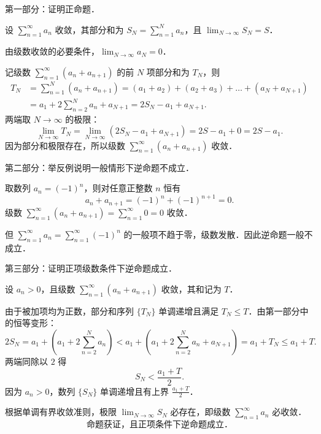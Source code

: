 \begin{solution}
    第一部分：证明正命题．

    设 $\sum_{n=1}^\infty a_n$ 收敛，其部分和为 $S_N = \sum_{n=1}^N a_n$，且 $\lim_{N\to\infty} S_N = S$．

    由级数收敛的必要条件，$\lim_{N\to\infty} a_N = 0$．

    记级数 $\sum_{n=1}^\infty (a_n + a_{n+1})$ 的前 $N$ 项部分和为 $T_N$，则
    \begin{equation}
        \begin{aligned}
            T_N & = \sum_{n=1}^N (a_n + a_{n+1}) = (a_1 + a_2) + (a_2 + a_3) + \dots + (a_N + a_{N+1}) \\
                & = a_1 + 2\sum_{n=2}^N a_n + a_{N+1} = 2S_N - a_1 + a_{N+1}.
        \end{aligned}
    \end{equation}
    两端取 $N \to \infty$ 的极限：
    \begin{equation}
        \lim_{N\to\infty} T_N = \lim_{N\to\infty} (2S_N - a_1 + a_{N+1}) = 2S - a_1 + 0 = 2S - a_1.
    \end{equation}
    因为部分和极限存在，所以级数 $\sum_{n=1}^\infty (a_n + a_{n+1})$ 收敛．

    第二部分：举反例说明一般情形下逆命题不成立．

    取数列 $a_n = (-1)^n$，则对任意正整数 $n$ 恒有
    \begin{equation}
        a_n + a_{n+1} = (-1)^n + (-1)^{n+1} = 0.
    \end{equation}
    级数 $\sum_{n=1}^\infty (a_n + a_{n+1}) = \sum_{n=1}^\infty 0 = 0$ 收敛．

    但 $\sum_{n=1}^\infty a_n = \sum_{n=1}^\infty (-1)^n$ 的一般项不趋于零，级数发散．因此逆命题一般不成立．

    第三部分：证明正项级数条件下逆命题成立．

    设 $a_n > 0$，且级数 $\sum_{n=1}^\infty (a_n + a_{n+1})$ 收敛，其和记为 $T$．

    由于被加项均为正数，部分和序列 $\{T_N\}$ 单调递增且满足 $T_N \leqslant T$．由第一部分中的恒等变形：
    \begin{equation}
        2S_N = a_1 + \left( a_1 + 2\sum_{n=2}^N a_n \right) < a_1 + \left( a_1 + 2\sum_{n=2}^N a_n + a_{N+1} \right) = a_1 + T_N \leqslant a_1 + T.
    \end{equation}
    两端同除以 $2$ 得
    \begin{equation}
        S_N < \frac{a_1 + T}{2}.
    \end{equation}
    因为 $a_n > 0$，数列 $\{S_N\}$ 单调递增且有上界 $\frac{a_1 + T}{2}$．

    根据单调有界收敛准则，极限 $\lim_{N\to\infty} S_N$ 必存在，即级数 $\sum_{n=1}^\infty a_n$ 必收敛．
    \begin{equation}
        \boxed{\text{命题获证，且正项条件下逆命题成立．}}
    \end{equation}
\end{solution}

